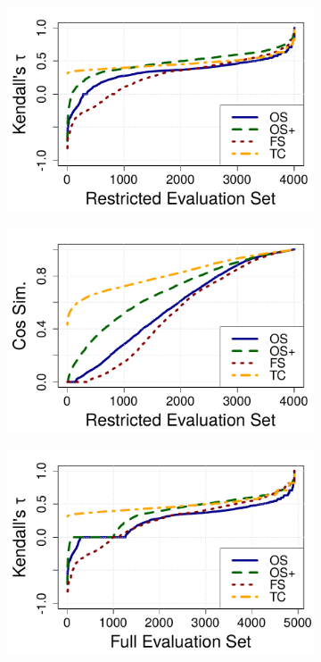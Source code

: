 \begin{figure}[t!]
\begin{subfigure}{.25\textwidth}
\centering
\includegraphics[width=\linewidth]{img/kendall_tau_restricted.pdf}
\end{subfigure}%
\begin{subfigure}{.25\textwidth}
\includegraphics[width=\linewidth]{img/cos_sim_restricted.pdf}
\end{subfigure}
\begin{subfigure}{.25\textwidth}
\centering
\includegraphics[width=\linewidth]{img/kendall_tau_full.pdf}

\end{subfigure}
\end{figure}
